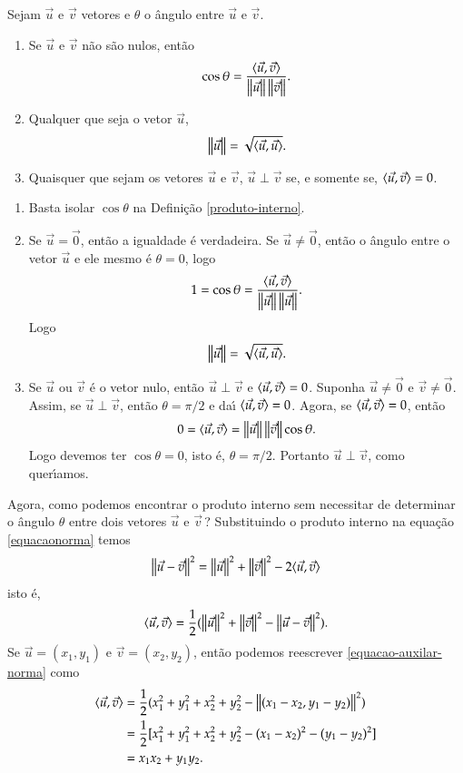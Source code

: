 \begin{proposicao}
  Sejam $\vec{u}$ e $\vec{v}$ vetores e $\theta$ o \^angulo entre $\vec{u}$ e $\vec{v}$.
  \begin{enumerate}
    \item Se $\vec{u}$ e $\vec{v}$ n\~ao s\~ao nulos, ent\~ao
    \[
      \cos\theta = \dfrac{\langle \vec{u}, \vec{v} \rangle}{\left\Vert{\vec{u}}\right\Vert\left\Vert{\vec{v}}\right\Vert}.
    \]
    \item Qualquer que seja o vetor $\vec{u}$,
    \[
      \left\Vert{\vec{u}}\right\Vert = \sqrt{\langle \vec{u}, \vec{u} \rangle}.
    \]
    \item Quaisquer que sejam os vetores $\vec{u}$ e $\vec{v}$, $\vec{u}\perp\vec{v}$ se, e somente se, $\langle \vec{u}, \vec{v} \rangle = 0$.
    \end{enumerate}
\end{proposicao}
\begin{prova}
  \begin{enumerate}
    \item Basta isolar $\cos\theta$ na Defini\c{c}\~ao \ref{produto-interno}.
    \item Se $\vec{u} = \vec{0}$, ent\~ao a igualdade \'e verdadeira. Se $\vec{u} \ne \vec{0}$, ent\~ao o \^angulo entre o vetor $\vec{u}$ e ele mesmo \'e $\theta = 0$, logo
    \[
      1 = \cos\theta = \dfrac{\langle \vec{u}, \vec{v} \rangle}{\left\Vert{\vec{u}}\right\Vert\left\Vert{\vec{u}}\right\Vert}.
    \]
    Logo
    \[
      \left\Vert{\vec{u}}\right\Vert = \sqrt{\langle \vec{u}, \vec{u} \rangle}.
    \]
    \item Se $\vec{u}$ ou $\vec{v}$ \'e o vetor nulo, ent\~ao $\vec{u}\perp\vec{v}$ e $\langle \vec{u}, \vec{v} \rangle = 0$. Suponha $\vec{u} \ne \vec{0}$ e $\vec{v} \ne \vec{0}$. Assim, se $\vec{u} \perp\vec{v}$, ent\~ao $\theta = \pi/2$ e da{\'\i} $\langle \vec{u}, \vec{v} \rangle = 0$. Agora, se $\langle \vec{u}, \vec{v} \rangle = 0$, ent\~ao
    \[
      0 = \langle \vec{u}, \vec{v} \rangle = \left\Vert{\vec{u}}\right\Vert\left\Vert{\vec{v}}\right\Vert\cos\theta.
    \]
    Logo devemos ter $\cos\theta = 0$, isto \'e, $\theta = \pi/2$. Portanto $\vec{u}\perp\vec{v}$, como quer{\'\i}amos.
  \end{enumerate}
\end{prova}

Agora, como podemos encontrar o produto interno sem necessitar de determinar o \^angulo $\theta$ entre dois vetores $\vec{u}$ e $\vec{v}$\,? Substituindo o produto interno na equa\c{c}\~ao \eqref{equacaonorma} temos
\[
  \left\Vert{\vec{u} - \vec{v}}\right\Vert^2 = \left\Vert{\vec{u}}\right\Vert^2 + \left\Vert{\vec{v}}\right\Vert^2 - 2\langle \vec{u}, \vec{v} \rangle
\]
isto \'e,
\begin{align}\label{equacao-auxilar-norma}
  \langle \vec{u}, \vec{v} \rangle = \dfrac{1}{2}(\left\Vert{\vec{u}}\right\Vert^2 + \left\Vert{\vec{v}}\right\Vert^2 - \left\Vert{\vec{u} - \vec{v}}\right\Vert^2).
\end{align}
Se $\vec{u} = (x_1, y_1)$ e $\vec{v} = (x_2, y_2)$, ent\~ao podemos reescrever \eqref{equacao-auxilar-norma} como
\begin{align*}
  \langle \vec{u}, \vec{v} \rangle &= \dfrac{1}{2}(x_1^2 + y_1^2 + x_2^2 + y_2^2 - \left\Vert{(x_1 - x_2, y_1 - y_2)}\right\Vert^2)\\
  &= \dfrac{1}{2}[x_1^2 + y_1^2 + x_2^2 + y_2^2 - (x_1 - x_2)^2 - (y_1 - y_2)^2]\\
  &= x_1x_2 + y_1y_2.
\end{align*}

